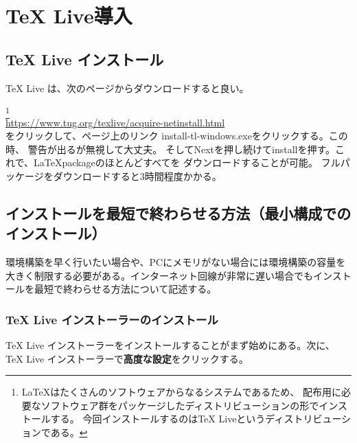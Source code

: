 \documentclass[titlepage]{ltjsarticle}
\begin{document}
\section{TeX Live導入}

\subsection{TeX Live インストール}
TeX Live は、次のページからダウンロードすると良い。

\footnote{
  \LaTeX はたくさんのソフトウェアからなるシステムであるため、
  配布用に必要なソフトウェア群をパッケージしたディストリビューションの形でインストールする。
  今回インストールするのはTeX Liveというディストリビューションである。
}
\\
\url{https://www.tug.org/texlive/acquire-netinstall.html}\\
をクリックして、ページ上のリンク install-tl-windows.exeをクリックする。この時、
警告が出るが無視して大丈夫。
そしてNextを押し続けてinstallを押す。これで、\LaTeX packageのほとんどすべてを
ダウンロードすることが可能。
フルパッケージをダウンロードすると3時間程度かかる。
\subsection{インストールを最短で終わらせる方法（最小構成でのインストール）}
環境構築を早く行いたい場合や、PCにメモリがない場合には環境構築の容量を大きく制限する必要がある。インターネット回線が非常に遅い場合でもインストールを最短で終わらせる方法について記述する。
\subsubsection{TeX Live インストーラーのインストール}
TeX Live インストーラーをインストールすることがまず始めにある。次に、TeX Live インストーラーで\textbf{高度な設定}をクリックする。
\end{document}
